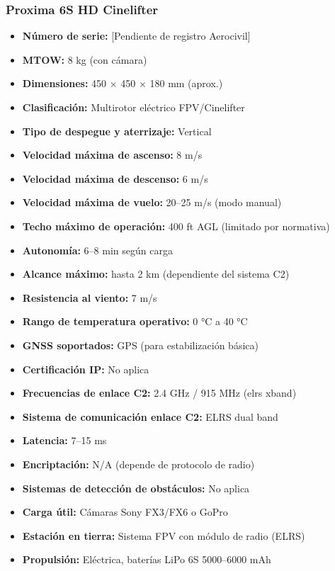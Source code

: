 \subsubsection*{Proxima 6S HD Cinelifter}
\begin{itemize}
    \item \textbf{Número de serie:} [Pendiente de registro Aerocivil]
    \item \textbf{MTOW:} 8 kg (con cámara)
    \item \textbf{Dimensiones:} 450 × 450 × 180 mm (aprox.)
    \item \textbf{Clasificación:} Multirotor eléctrico FPV/Cinelifter
    \item \textbf{Tipo de despegue y aterrizaje:} Vertical
    \item \textbf{Velocidad máxima de ascenso:} 8 m/s
    \item \textbf{Velocidad máxima de descenso:} 6 m/s
    \item \textbf{Velocidad máxima de vuelo:} 20–25 m/s (modo manual)
    \item \textbf{Techo máximo de operación:} 400 ft AGL (limitado por normativa)
    \item \textbf{Autonomía:} 6–8 min según carga
    \item \textbf{Alcance máximo:} hasta 2 km (dependiente del sistema C2)
    \item \textbf{Resistencia al viento:} 7 m/s
    \item \textbf{Rango de temperatura operativo:} 0 °C a 40 °C
    \item \textbf{GNSS soportados:} GPS (para estabilización básica)
    \item \textbf{Certificación IP:} No aplica
    \item \textbf{Frecuencias de enlace C2:} 2.4 GHz / 915 MHz (elrs xband)
    \item \textbf{Sistema de comunicación enlace C2:} ELRS dual band
    \item \textbf{Latencia:} 7–15 ms
    \item \textbf{Encriptación:} N/A (depende de protocolo de radio)
    \item \textbf{Sistemas de detección de obstáculos:} No aplica
    \item \textbf{Carga útil:} Cámaras Sony FX3/FX6 o GoPro
    \item \textbf{Estación en tierra:} Sistema FPV con módulo de radio (ELRS)
    \item \textbf{Propulsión:} Eléctrica, baterías LiPo 6S 5000–6000 mAh
\end{itemize}

